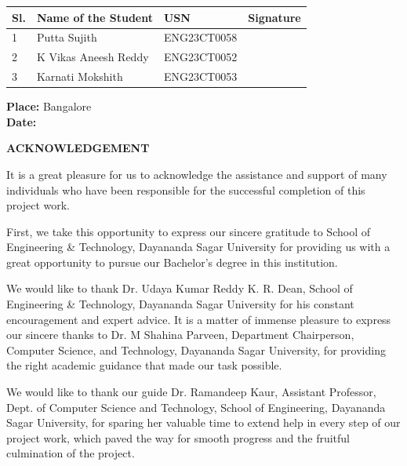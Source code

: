 \documentclass[a4paper,12pt]{article}
\begin{document}
\vspace{1.5cm}

\noindent
\begin{table}[H]
\centering
\renewcommand{\arraystretch}{1.8}
\begin{tabular}{|p{0.8cm}|p{5.5cm}|p{3.5cm}|p{4cm}|}
\hline
\rowcolor{gray!10}
\textbf{Sl.} & \textbf{Name of the Student} & \textbf{USN} & \textbf{Signature} \\ \hline
1 & Putta Sujith & ENG23CT0058 & \\ \hline
2 & K Vikas Aneesh Reddy & ENG23CT0052 & \\ \hline
3 & Karnati Mokshith & ENG23CT0053 & \\ \hline
\end{tabular}
\end{table}
\vspace{0.5cm}

\noindent \textbf{Place:} Bangalore \\
\noindent \textbf{Date:}
\clearpage

\begin{center}
    \textbf{\Large ACKNOWLEDGEMENT}
\end{center}

It is a great pleasure for us to acknowledge the assistance and support of many individuals who have been responsible for the successful completion of this project work.

First, we take this opportunity to express our sincere gratitude to School of Engineering \& Technology, Dayananda Sagar University for providing us with a great opportunity to pursue our Bachelor’s degree in this institution.

We would like to thank Dr. Udaya Kumar Reddy K. R. Dean, School of Engineering \& Technology, Dayananda Sagar University for his constant encouragement and expert advice. It is a matter of immense pleasure to express our sincere thanks to Dr. M Shahina Parveen, Department Chairperson, Computer Science, and Technology, Dayananda Sagar University, for providing the right academic guidance that made our task possible.

We would like to thank our guide Dr. Ramandeep Kaur, Assistant Professor, Dept. of Computer Science and Technology, School of Engineering, Dayananda Sagar University, for sparing her valuable time to extend help in every step of our project work, which paved the way for smooth progress and the fruitful culmination of the project.
\end{document}
